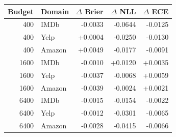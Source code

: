 \begin{tabular}{rlrrr}\toprule
Budget & Domain & $\Delta$ Brier & $\Delta$ NLL & $\Delta$ ECE\\\midrule
400 & IMDb & -0.0033 & -0.0644 & -0.0125 \\
400 & Yelp & +0.0004 & -0.0250 & -0.0130 \\
400 & Amazon & +0.0049 & -0.0177 & -0.0091 \\
1600 & IMDb & -0.0010 & +0.0120 & +0.0035 \\
1600 & Yelp & -0.0037 & -0.0068 & +0.0059 \\
1600 & Amazon & -0.0039 & -0.0024 & +0.0021 \\
6400 & IMDb & -0.0015 & -0.0154 & -0.0022 \\
6400 & Yelp & -0.0012 & -0.0301 & -0.0065 \\
6400 & Amazon & -0.0028 & -0.0415 & -0.0066 \\
\bottomrule\end{tabular}
